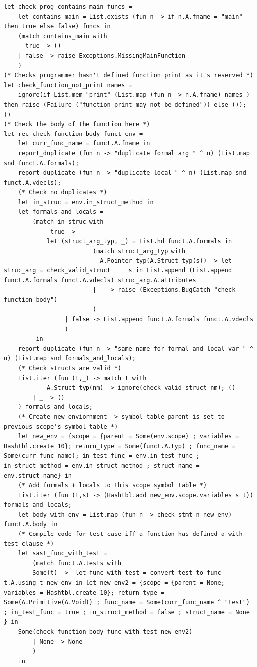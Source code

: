 \documentclass{article}
\begin{document}
\begin{lstlisting}
let check_prog_contains_main funcs =
	let contains_main = List.exists (fun n -> if n.A.fname = "main" then true else false) funcs in
	(match contains_main with
	  true -> ()
	| false -> raise Exceptions.MissingMainFunction
	)
(* Checks programmer hasn't defined function print as it's reserved *)
let check_function_not_print names = 
	ignore(if List.mem "print" (List.map (fun n -> n.A.fname) names ) then raise (Failure ("function print may not be defined")) else ()); ()
(* Check the body of the function here *)
let rec check_function_body funct env =
	let curr_func_name = funct.A.fname in
	report_duplicate (fun n -> "duplicate formal arg " ^ n) (List.map snd funct.A.formals);
	report_duplicate (fun n -> "duplicate local " ^ n) (List.map snd funct.A.vdecls);
	(* Check no duplicates *)
	let in_struc = env.in_struct_method in
	let formals_and_locals =
		(match in_struc with
			 true ->
			let (struct_arg_typ, _) = List.hd funct.A.formals in
                         (match struct_arg_typ with
                           A.Pointer_typ(A.Struct_typ(s)) -> let struc_arg = check_valid_struct     s in List.append (List.append funct.A.formals funct.A.vdecls) struc_arg.A.attributes
                         | _ -> raise (Exceptions.BugCatch "check function body")
                         )
                 | false -> List.append funct.A.formals funct.A.vdecls
                 )
         in
	report_duplicate (fun n -> "same name for formal and local var " ^ n) (List.map snd formals_and_locals);
	(* Check structs are valid *)
	List.iter (fun (t,_) -> match t with 
			A.Struct_typ(nm) -> ignore(check_valid_struct nm); ()
		| _ -> ()
	) formals_and_locals;
	(* Create new enviornment -> symbol table parent is set to previous scope's symbol table *)
	let new_env = {scope = {parent = Some(env.scope) ; variables = Hashtbl.create 10}; return_type = Some(funct.A.typ) ; func_name = Some(curr_func_name); in_test_func = env.in_test_func ; in_struct_method = env.in_struct_method ; struct_name = env.struct_name} in
	(* Add formals + locals to this scope symbol table *)
	List.iter (fun (t,s) -> (Hashtbl.add new_env.scope.variables s t)) formals_and_locals;
	let body_with_env = List.map (fun n -> check_stmt n new_env) funct.A.body in
	(* Compile code for test case iff a function has defined a with test clause *)
	let sast_func_with_test = 
		(match funct.A.tests with
		Some(t) ->  let func_with_test = convert_test_to_func t.A.using t new_env in let new_env2 = {scope = {parent = None; variables = Hashtbl.create 10}; return_type = Some(A.Primitive(A.Void)) ; func_name = Some(curr_func_name ^ "test") ; in_test_func = true ; in_struct_method = false ; struct_name = None } in
	Some(check_function_body func_with_test new_env2) 
		| None -> None
		)
	in	
		

\end{lstlisting}
\end{document}
